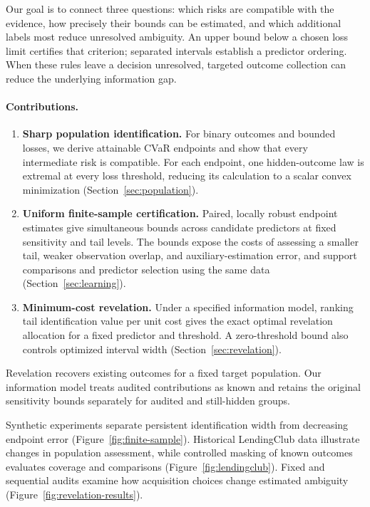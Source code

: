 Our goal is to connect three questions: which risks are compatible with the evidence, how precisely
their bounds can be estimated, and which additional labels most reduce unresolved ambiguity. An
upper bound below a chosen loss limit certifies that criterion; separated intervals establish a
predictor ordering. When these rules leave a decision unresolved, targeted outcome collection can
reduce the underlying information gap.

\paragraph{Contributions.}
\begin{enumerate}
\item \textbf{Sharp population identification.} For binary outcomes and bounded losses, we derive attainable CVaR endpoints and show that every intermediate risk is compatible. For each endpoint, one hidden-outcome law is extremal at every loss threshold, reducing its calculation to a scalar convex minimization (Section~\ref{sec:population}).

\item \textbf{Uniform finite-sample certification.} Paired, locally robust endpoint estimates give simultaneous bounds across candidate predictors at fixed sensitivity and tail levels. The bounds expose the costs of assessing a smaller tail, weaker observation overlap, and auxiliary-estimation error, and support comparisons and predictor selection using the same data (Section~\ref{sec:learning}).

\item \textbf{Minimum-cost revelation.} Under a specified information model, ranking tail identification value per unit cost gives the exact optimal revelation allocation for a fixed predictor and threshold. A zero-threshold bound also controls optimized interval width (Section~\ref{sec:revelation}).
\end{enumerate}

Revelation recovers existing outcomes for a fixed target population. Our information model treats
audited contributions as known and retains the original sensitivity bounds separately for audited
and still-hidden groups.

Synthetic experiments separate persistent identification width from decreasing endpoint error
(Figure~\ref{fig:finite-sample}). Historical LendingClub data illustrate changes in population
assessment, while controlled masking of known outcomes evaluates coverage and comparisons
(Figure~\ref{fig:lendingclub}). Fixed and sequential audits examine how acquisition choices change
estimated ambiguity (Figure~\ref{fig:revelation-results}).

